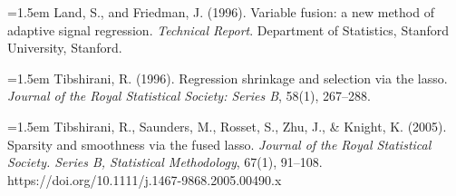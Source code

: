 \documentclass[12pt]{article}
\begin{document}
\noindent
\hangindent=1.5em
Land, S., and Friedman, J. (1996). Variable fusion: a new method of adaptive signal regression. \textit{Technical Report}. Department of Statistics, Stanford University, Stanford.

\noindent
\hangindent=1.5em
Tibshirani, R. (1996). Regression shrinkage and selection via the lasso. \textit{Journal of the Royal Statistical Society: Series B}, 58(1), 267--288.

\noindent
\hangindent=1.5em
Tibshirani, R., Saunders, M., Rosset, S., Zhu, J., \& Knight, K. (2005). Sparsity and smoothness via the fused lasso. \textit{Journal of the Royal Statistical Society. Series B, Statistical Methodology}, 67(1), 91–108. https://doi.org/10.1111/j.1467-9868.2005.00490.x
\end{document}
